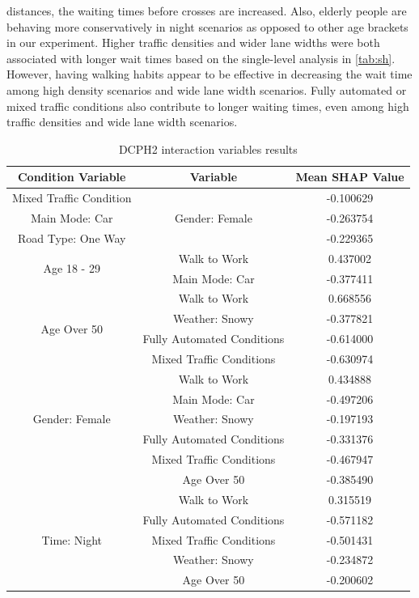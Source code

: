 distances, the waiting times before crosses are increased. Also, elderly people are behaving more conservatively in night scenarios as opposed to other age brackets in our experiment. Higher traffic densities and wider lane widths were both associated with longer wait times based on the single-level analysis in \cref{tab:sh}. However, having walking habits appear to be effective in decreasing the wait time among high density scenarios and wide lane width scenarios. Fully automated or mixed traffic conditions also contribute to longer waiting times, even among high traffic densities and wide lane width scenarios.
\begin{table}
\caption{DCPH2 interaction variables results}
\footnotesize
    \centering
    \begin{tabular}{|ccc|}
    \hline
    \textbf{Condition Variable} &   \textbf{Variable} &  \textbf{Mean SHAP Value} \\
    \hline
    Mixed Traffic Condition & \multirow{3}{*}{Gender: Female} &-0.100629 \\ Main Mode: Car& &-0.263754\\Road Type: One Way && -0.229365 \\
    \hline
    \hline
    \multirow{2}{*}{Age 18 - 29} & Walk to Work &  0.437002  \\
    &Main Mode: Car &  -0.377411\\
    \hline
    \hline
    \multirow{4}{*}{Age Over 50} & Walk to Work &  0.668556 \\
    
     & Weather: Snowy&  -0.377821 \\
    
    &Fully Automated Conditions &  -0.614000\\
    &Mixed Traffic Conditions &  -0.630974\\
    \hline
    \hline
    \multirow{5}{*}{Gender: Female} & Walk to Work &  0.434888 \\
        &Main Mode: Car  &  -0.497206\\
     & Weather: Snowy&  -0.197193 \\
    
    &Fully Automated Conditions &  -0.331376\\
    &Mixed Traffic Conditions &  -0.467947\\
    &Age Over 50  & -0.385490\\
    \hline
    \hline
     \multirow{5}{*}{Time: Night} & Walk to Work &  0.315519 \\
    &Fully Automated Conditions &  -0.571182\\
    &Mixed Traffic Conditions&  -0.501431\\
    &Weather: Snowy  & -0.234872\\
    &Age Over 50 & -0.200602\\


\end{tabular}
\end{table}
